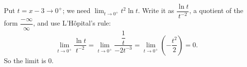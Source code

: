 Put $t=x-3\to0^+$; we need $\lim_{t\to0^+}t^2\ln t$. Write it as $\dfrac{\ln t}{t^{-2}}$, a quotient of the form $\dfrac{-\infty}{\infty}$, and use L'H\^opital's rule:
\[
\lim_{t\to0^+}\dfrac{\ln t}{t^{-2}}=\lim_{t\to0^+}\dfrac{\dfrac{1}{t}}{-2t^{-3}}=\lim_{t\to0^+}\left(-\dfrac{t^2}{2}\right)=0 .
\]
So the limit is $\boxed{0}$.
